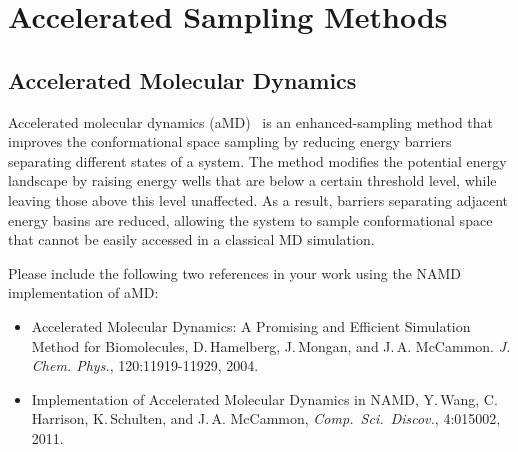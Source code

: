 \section{Accelerated Sampling Methods}
\label{section:accel}

\subsection{Accelerated Molecular Dynamics}
\label{section:accelmd}
Accelerated molecular dynamics (aMD)~\cite{HAME2004mc} is an enhanced-sampling method that
improves the conformational space sampling by 
reducing energy barriers separating different states of a system.
The method modifies the potential 
energy landscape by raising energy wells that are below
a certain threshold level, while leaving those above this level unaffected.
As a result, barriers separating adjacent energy basins are reduced, allowing the system to sample
conformational space that cannot be easily accessed in a classical MD simulation.

Please include the following two references in your work using the NAMD implementation of aMD:
\begin{itemize}
  \item {Accelerated Molecular Dynamics: A Promising and Efficient Simulation Method for Biomolecules, D.\,Hamelberg, J.\,Mongan, and J.\,A. McCammon. {\it J. Chem. Phys.}, 120:11919-11929, 2004.}
  \item{Implementation of Accelerated Molecular Dynamics in NAMD, Y.\,Wang, C.\,Harrison, K.\,Schulten, and J.\,A. McCammon, {\it Comp.~Sci.~Discov.}, 4:015002, 2011.}
\end{itemize}

